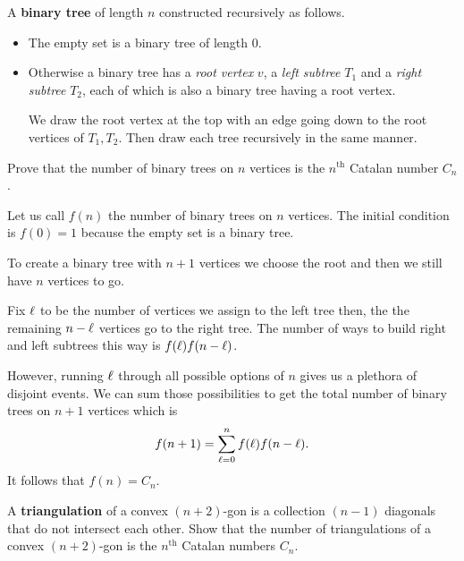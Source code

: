 \documentclass[12pt]{memoir}
\begin{document}
\begin{Ej}[Exercise 5]
   A \textbf{binary tree} of length $n$ constructed recursively as follows.\par 
   \vspace*{-0.6em}

   \begin{itemize}
      \itemsep=-0.4em
      \item The empty set is a binary tree of length 0.
      \item Otherwise a binary tree has a \emph{root vertex} $v$, a \emph{left subtree} $T_1$ and a \emph{right subtree} $T_2$, each of which is also a binary tree having a root vertex.\par 
      \vspace*{-0.4em}
      We draw the root vertex at the top with an edge going down to the root vertices of $T_1, T_2$. Then draw each tree recursively in the same manner.
   \end{itemize}
   \vspace*{-0.6em}

   Prove that the number of binary trees on $n$ vertices is the $n^{\text{th}}$ Catalan number $C_n$.
   \end{Ej}
   
   \begin{ptcbr}
Let us call $f(n)$ the number of binary trees on $n$ vertices. The initial condition is $f(0)=1$ because the empty set is a binary tree.\par 
To create a binary tree with $n+1$ vertices we choose the root and then we still have $n$ vertices to go.\par 
Fix $\ell$ to be the number of vertices we assign to the left tree then, the the remaining $n-\ell$ vertices go to the right tree. The number of ways to build right and left subtrees this way is $f(\ell)f(n-\ell)$.\par 
However, running $\ell$ through all possible options of $n$ gives us a plethora of disjoint events. We can sum those  possibilities to get the total number of binary trees on $n+1$ vertices which is 
$$f(n+1)=\sum_{\ell=0}^{n}f(\ell)f(n-\ell).$$
It follows that $f(n)=C_n$. 
      \end{ptcbr}

\begin{Ej}[Exercise 6]
   A \textbf{triangulation} of a convex $(n+2)$-gon is a collection $(n-1)$ diagonals that do not intersect each other. Show that the number of triangulations of a convex $(n+2)$-gon is the $n^{\text{th}}$ Catalan numbers $C_n$. 
   \end{Ej}
   
\end{document}
